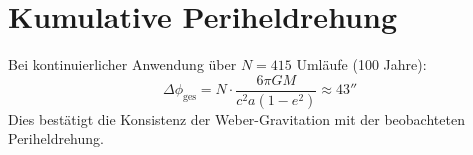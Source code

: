 \section{Kumulative Periheldrehung}
Bei kontinuierlicher Anwendung über $N = 415$ Umläufe (100 Jahre):
\[
\Delta \phi_{\text{ges}} = N \cdot \frac{6\pi GM}{c^2 a(1-e^2)} \approx 43''
\]
Dies bestätigt die Konsistenz der Weber-Gravitation mit der beobachteten Periheldrehung.